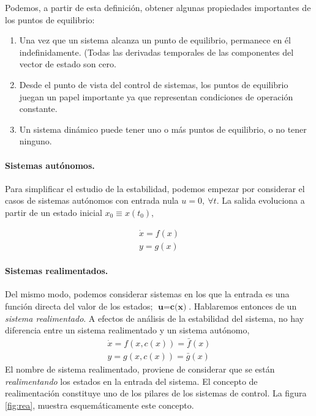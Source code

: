 Podemos, a partir de esta definición, obtener algunas propiedades importantes de los puntos de equilibrio:
\begin{enumerate}
\item Una vez que un sistema alcanza un punto de equilibrio, permanece en él indefinidamente. (Todas las derivadas temporales de las componentes del vector de estado son cero.
\item Desde el punto de vista del control de sistemas, los puntos de equilibrio juegan un papel importante ya que representan condiciones de operación constante.
\item Un sistema dinámico puede tener uno o más puntos de equilibrio, o no tener ninguno. 
\end{enumerate}

\paragraph{Sistemas autónomos.} Para simplificar el estudio de la estabilidad, podemos empezar por considerar el casos de sistemas autónomos con entrada nula  $u = 0, \ \forall t$. La salida evoluciona a partir de un estado inicial $x_0\equiv x(t_0)$,

\begin{align}
\dot{x} = f(x)\\
y = g(x)
\end{align}

\paragraph{Sistemas realimentados.} Del mismo modo, podemos considerar sistemas en los que la entrada es una función directa del valor de los estados; $\textbf{u}= \textbf{c(x)}$. Hablaremos entonces de un \emph{sistema realimentado}. A efectos de análisis de la estabilidad del sistema, no hay diferencia entre un sistema realimentado y un sistema autónomo,
\begin{align}
\dot{x} = f(x,c(x)) = \bar{f}(x)\\
y = g(x,c(x)) = \bar{g}(x)
\end{align}
El nombre de sistema realimentado, proviene de considerar que se están \emph{realimentando} los estados en la entrada del sistema. El concepto de realimentación constituye uno de los pilares de los sistemas de control. La figura \ref{fig:rea}, muestra esquemáticamente este concepto.

